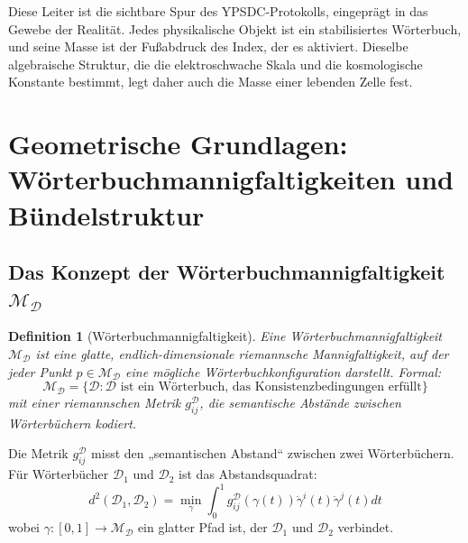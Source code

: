 \documentclass[11pt,a4paper]{article}
\newtheorem{definition}{Definition}
\begin{document}
Diese Leiter ist die sichtbare Spur des YPSDC-Protokolls, eingeprägt in
das Gewebe der Realität. Jedes physikalische Objekt ist ein stabilisiertes
Wörterbuch, und seine Masse ist der Fußabdruck des Index, der es aktiviert.
Dieselbe algebraische Struktur, die die elektroschwache Skala und die
kosmologische Konstante bestimmt, legt daher auch die Masse einer lebenden
Zelle fest.

	\section{Geometrische Grundlagen: Wörterbuchmannigfaltigkeiten und Bündelstruktur}
	\subsection{Das Konzept der Wörterbuchmannigfaltigkeit $\mathcal{M}_{\mathcal{D}}$}
	
	\begin{definition}[Wörterbuchmannigfaltigkeit]
		Eine Wörterbuchmannigfaltigkeit $\mathcal{M}_{\mathcal{D}}$ ist eine glatte, endlich-dimensionale riemannsche Mannigfaltigkeit, auf der jeder Punkt $p \in \mathcal{M}_{\mathcal{D}}$ eine mögliche Wörterbuchkonfiguration darstellt. Formal:
		\begin{equation}
			\mathcal{M}_{\mathcal{D}} = \{ \mathcal{D} : \mathcal{D} \text{ ist ein Wörterbuch, das Konsistenzbedingungen erfüllt} \}
		\end{equation}
		mit einer riemannschen Metrik $g_{ij}^{\mathcal{D}}$, die semantische Abstände zwischen Wörterbüchern kodiert.
	\end{definition}
	
	Die Metrik $g_{ij}^{\mathcal{D}}$ misst den „semantischen Abstand“ zwischen zwei Wörterbüchern. Für Wörterbücher $\mathcal{D}_1$ und $\mathcal{D}_2$ ist das Abstandsquadrat:
	\begin{equation}
		d^2(\mathcal{D}_1, \mathcal{D}_2) = \min_{\gamma} \int_0^1 g_{ij}^{\mathcal{D}}(\gamma(t)) \dot{\gamma}^i(t) \dot{\gamma}^j(t) dt
	\end{equation}
	wobei $\gamma: [0,1] \to \mathcal{M}_{\mathcal{D}}$ ein glatter Pfad ist, der $\mathcal{D}_1$ und $\mathcal{D}_2$ verbindet.
	
\end{document}
